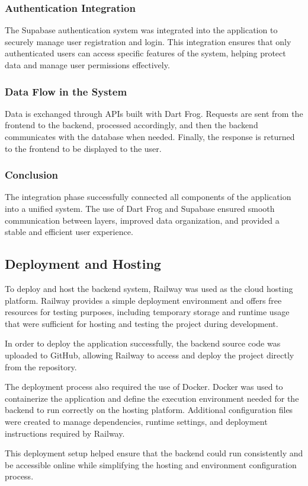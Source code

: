 \documentclass[12pt]{article}
\begin{document}
\subsubsection{Authentication Integration}
The Supabase authentication system was integrated into the application to securely manage user registration and login. This integration ensures that only authenticated users can access specific features of the system, helping protect data and manage user permissions effectively.
\subsubsection{Data Flow in the System}
Data is exchanged through APIs built with Dart Frog. Requests are sent from the frontend to the backend, processed accordingly, and then the backend communicates with the database when needed. Finally, the response is returned to the frontend to be displayed to the user.
\subsubsection{Conclusion}
The integration phase successfully connected all components of the application into a unified system. The use of Dart Frog and Supabase ensured smooth communication between layers, improved data organization, and provided a stable and efficient user experience.
\subsection{Deployment and Hosting}
To deploy and host the backend system, Railway was used as the cloud hosting platform. Railway provides a simple deployment environment and offers free resources for testing purposes, including temporary storage and runtime usage that were sufficient for hosting and testing the project during development.

In order to deploy the application successfully, the backend source code was uploaded to GitHub, allowing Railway to access and deploy the project directly from the repository.

The deployment process also required the use of Docker. Docker was used to containerize the application and define the execution environment needed for the backend to run correctly on the hosting platform. Additional configuration files were created to manage dependencies, runtime settings, and deployment instructions required by Railway.

This deployment setup helped ensure that the backend could run consistently and be accessible online while simplifying the hosting and environment configuration process.
\end{document}
